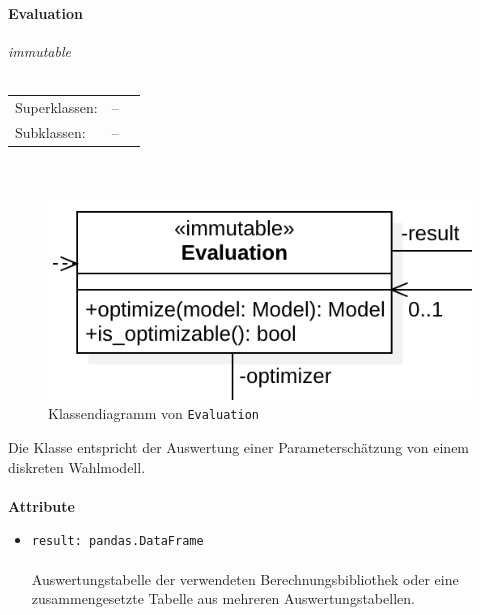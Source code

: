 \documentclass{article}
\newcommand{\classheader}[2][]{\paragraph{#2}
\mbox{}\textit{#1}\\\\}
\begin{document}
\newpage
\classheader[\flqq{}immutable\frqq]{Evaluation}\label{cls:Evaluation}
\begin{tabular}{lll}
 Superklassen: & --\\
 Subklassen: & --
\end{tabular}\\
\begin{figure}[H]%
    \centering
    \includegraphics[width=13cm]{entwurf/Entwurf_dokument/img/cls/model/Evaluation.png}
    \caption{Klassendiagramm von \texttt{Evaluation}}
\end{figure}

Die Klasse entspricht der Auswertung einer Parameterschätzung von einem diskreten Wahlmodell.
\\\\

\textbf{Attribute}
\begin{itemize}\setlength\itemsep{3em}
\item \texttt{result: pandas.DataFrame}\\\\
Auswertungstabelle der verwendeten Berechnungsbibliothek oder eine zusammengesetzte Tabelle aus mehreren Auswertungstabellen.
\\\\
\end{itemize}
\end{document}
